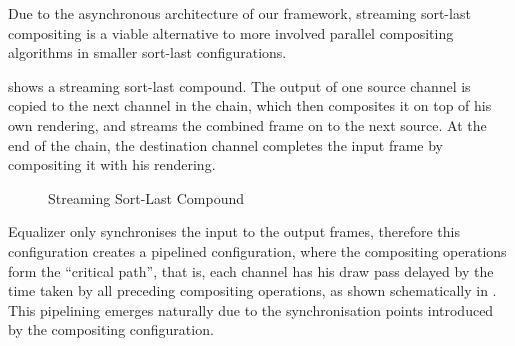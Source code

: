 Due to the asynchronous architecture of our framework, streaming sort-last
compositing is a viable alternative to more involved parallel compositing
algorithms in smaller sort-last configurations.

 shows a streaming sort-last compound. The output of one source
channel is copied to the next channel in the chain, which then composites it on
top of his own rendering, and streams the combined frame on to the next source.
At the end of the chain, the destination channel completes the input frame by
compositing it with his rendering.

\begin{figure}[h!t]\center
  \hfil{}
  {\caption{Streaming Sort-Last Compound}}
\end{figure}

Equalizer only synchronises the input to the output frames, therefore this
configuration creates a pipelined configuration, where the compositing
operations form the ``critical path'', that is, each channel has his draw pass
delayed by the time taken by all preceding compositing operations, as shown
schematically in . This pipelining emerges naturally due to
the synchronisation points introduced by the compositing configuration.

